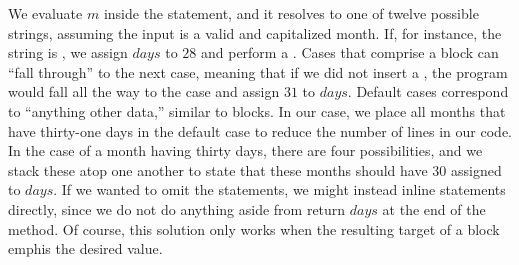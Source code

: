 We evaluate $m$ inside the  statement, and it resolves to one of twelve possible strings, assuming the input is a valid and capitalized month. If, for instance, the string is , we assign $\mathit{days}$ to $28$ and perform a . Cases that comprise a  block can ``fall through'' to the next case, meaning that if we did not insert a , the program would fall all the way to the  case and assign $31$ to $\mathit{days}$. Default cases correspond to ``anything other data,'' similar to  blocks. In our case, we place all months that have thirty-one days in the default case to reduce the number of lines in our code. In the case of a month having thirty days, there are four possibilities, and we stack these atop one another to state that these months should have $30$ assigned to $\mathit{days}$. If we wanted to omit the  statements, we might instead inline  statements directly, since we do not do anything aside from return $\mathit{days}$ at the end of the method. Of course, this solution only works when the resulting target of a  block emph{is} the desired value.